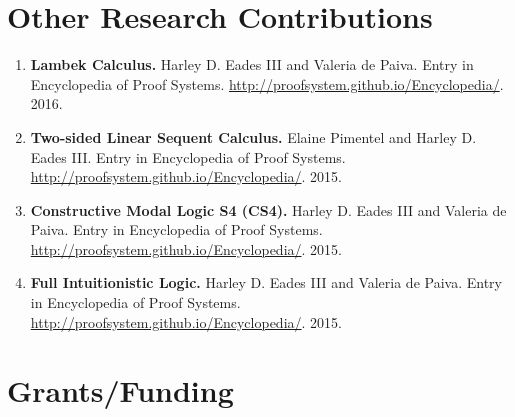 \documentclass[11pt]{article}
\begin{document}
    \section{Other Research Contributions}
    \label{subsec:other_work}
    \begin{enumerate}
    \item[] \textbf{Lambek Calculus.} Harley D. Eades III and Valeria de
      Paiva. Entry in Encyclopedia of Proof
      Systems. \url{http://proofsystem.github.io/Encyclopedia/}. 2016.

    \item[] \textbf{Two-sided Linear Sequent Calculus.} Elaine Pimentel and Harley D. Eades III. Entry in Encyclopedia of Proof Systems. \url{http://proofsystem.github.io/Encyclopedia/}. 2015.

    \item[] \textbf{Constructive Modal Logic S4 (CS4).} Harley D. Eades III and Valeria de Paiva. Entry in Encyclopedia of Proof Systems. \url{http://proofsystem.github.io/Encyclopedia/}. 2015.

    \item[] \textbf{Full Intuitionistic Logic.} Harley D. Eades III and Valeria de Paiva. Entry in Encyclopedia of Proof Systems. \url{http://proofsystem.github.io/Encyclopedia/}. 2015.
    \end{enumerate}

    \section{Grants/Funding}
    \label{subsec:funding_(awarded_grants)}
\end{document}
